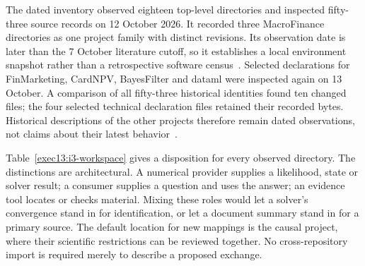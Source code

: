 The dated inventory observed eighteen top-level directories and inspected
fifty-three source records on 12 October 2026. It recorded three MacroFinance
directories as one project family with distinct revisions. Its observation
date is later than the 7 October literature cutoff, so it establishes a local
environment snapshot rather than a retrospective software census~\citep{v12_in_inventory}. Selected declarations for FinMarketing, CardNPV,
BayesFilter and dataml were inspected again on 13 October. A comparison of all
fifty-three historical identities found ten changed files; the four selected
technical declaration files retained their recorded bytes. Historical
descriptions of the other projects therefore remain dated observations, not
claims about their latest behavior~\citep{exec13_i3_inspection}.

Table~\ref{exec13:i3-workspace} gives a disposition for every observed
directory. The distinctions are architectural. A numerical provider supplies
a likelihood, state or solver result; a consumer supplies a question and uses
the answer; an evidence tool locates or checks material. Mixing these roles
would let a solver's convergence stand in for identification, or let a document
summary stand in for a primary source. The default location for new mappings
is the causal project, where their scientific restrictions can be reviewed
together. No cross-repository import is required merely to describe a proposed
exchange.

